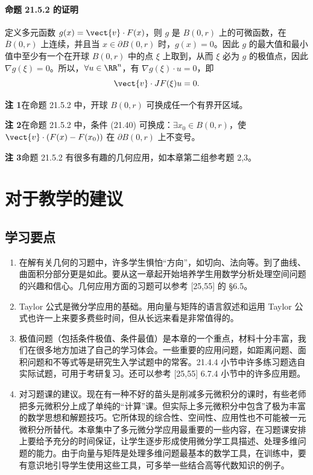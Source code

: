 \paragraph{命题 21.5.2 的证明}
定义多元函数 $g(x)=\vect{v}\cdot F(x)$，则 $g$ 是 $B(0,r)$ 上的可微函数，在 $\overline B(0,r)$ 上连续，并且当 $x\in\partial B(0,r)$ 时，$g(x)=0$。因此 $g$ 的最大值和最小值中至少有一个在开球 $B(0,r)$ 中的点 $\xi$ 上取到，从而 $\xi$ 必为 $g$ 的极值点，因此 $\nabla g(\xi)=0$。所以，$\forall u\in\RR^n$，有 $\nabla g(\xi)\cdot u=0$，即
\[
  \vect{v}\cdot JF(\xi)u=0.
\]

\begin{xremark}
\textbf{注 1}\quad 在命题 21.5.2 中，开球 $B(0,r)$ 可换成任一个有界开区域。

\textbf{注 2}\quad 在命题 21.5.2 中，条件 (21.40) 可换成：$\exists x_0\in B(0,r)$，使 $\vect{v}\cdot(F(x)-F(x_0))$ 在 $\partial B(0,r)$ 上不变号。

\textbf{注 3}\quad 命题 21.5.2 有很多有趣的几何应用，如本章第二组参考题 2,3。
\end{xremark}

\section{对于教学的建议}

\subsection{学习要点}

\begin{enumerate}[label=\arabic*.]
  \item 在解有关几何的习题中，许多学生惧怕“方向”，如切向、法向等。到了曲线、曲面积分部分更是如此。要从这一章起开始培养学生用数学分析处理空间问题的兴趣和信心。几何应用方面的习题可以参考 [25,55] 的 §6.5。
  \item Taylor 公式是微分学应用的基础。用向量与矩阵的语言叙述和运用 Taylor 公式也许一上来要多费些时间，但从长远来看是非常值得的。
  \item 极值问题（包括条件极值、条件最值）是本章的一个重点，材料十分丰富，我们在很多地方加进了自己的学习体会。一些重要的应用问题，如距离问题、面积问题和不等式等是研究生入学试题中的常客。21.4.4 小节中许多练习题选自实际试题，可用于考研复习。还可以参考 [25,55] 6.7.4 小节中的许多应用题。
  \item 对习题课的建议。现在有一种不好的苗头是削减多元微积分的课时，有些老师把多元微积分上成了单纯的“计算”课。但实际上多元微积分中包含了极为丰富的数学思想和解题技巧。它所体现的综合性、空间性、应用性也不可能被一元微积分所替代。本章集中了多元微分学应用最重要的一些内容，在习题课安排上要给予充分的时间保证，让学生逐步形成使用微分学工具描述、处理多维问题的能力。由于向量与矩阵是处理多维问题最基本的数学工具，在训练中，要有意识地引导学生使用这些工具，可多举一些结合高等代数知识的例子。
\end{enumerate}

